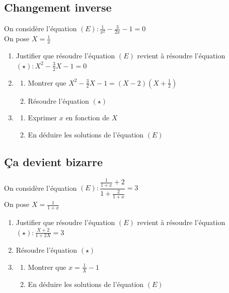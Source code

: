 \documentclass[oneside,12pt]{article}          %
\begin{document}
\subsection{Changement inverse}
On considère l'équation $(E):\frac{1}{x^2}-\frac{3}{2x}-1=0$ \\
On pose $X=\frac{1}{x}$
\begin{enumerate}
	\item Justifier que résoudre l'équation $(E)$ revient à résoudre l'équation $(\star):X^2-\frac{3}{2}X-1=0$
	\item \begin{enumerate}
		\item Montrer que $X^2-\frac{3}{2}X-1=(X-2)\left(X+\frac{1}{2}\right)$
		\item Résoudre l'équation $(\star)$
	\end{enumerate}
	\item \begin{enumerate}
		\item Exprimer $x$ en fonction de $X$
		\item En déduire les solutions de l'équation $(E)$
	\end{enumerate}
\end{enumerate}



\subsection{Ça devient bizarre}
On considère l'équation $(E):\dfrac{\frac{1}{1+x}+2}{1+\frac{2}{1+x}}=3$ \\
On pose $X=\frac{1}{1+x}$
\begin{enumerate}
	\item Justifier que résoudre l'équation $(E)$ revient à résoudre l'équation $(\star):\frac{X+2}{1+2X}=3$
	\item Résoudre l'équation $(\star)$
	\item \begin{enumerate}
		\item Montrer que $x=\frac{1}{X}-1$
		\item En déduire les solutions de l'équation $(E)$
	\end{enumerate}
\end{enumerate}
\end{document}
